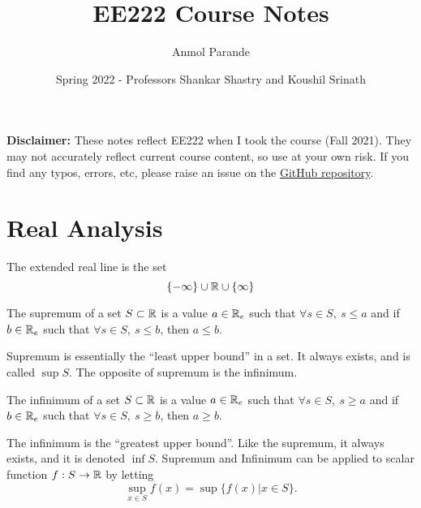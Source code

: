 

\title{EE222 Course Notes}
\author{Anmol Parande}
\date{Spring 2022 - Professors Shankar Shastry and Koushil Srinath}
\maketitle
\textbf{Disclaimer: }These notes reflect EE222 when I took the course (Fall 2021). They may not accurately reflect current course content, so use at your own risk.
If you find any typos, errors, etc, please raise an issue on the \href{https://github.com/parandea17/BerkeleyNotes}{GitHub repository}.
\tableofcontents
\newpage
\section{Real Analysis}
\begin{definition}
	The extended real line is the set \[
		\{-\infty\} \cup \mathbb{R} \cup \{\infty\}
	\]
	\label{defn:extended-real-line}
\end{definition}
\begin{definition}
	The supremum of a set $S \subset \mathbb{R}$ is a value $a \in \mathbb{R}_e$
	such that $\forall s\in S,\ s \leq a$ and if $b \in \mathbb{R}_e$ such that
	$\forall s\in S,\ s \leq b$, then $a \leq b$.
	\label{defn:supremum}
\end{definition}
Supremum is essentially the ``least upper bound'' in a set. It always exists,
and is called $\sup S$. The opposite of supremum is the infinimum.
\begin{definition}
	The infinimum of a set $S \subset \mathbb{R}$ is a value $a \in \mathbb{R}_e$
	such that $\forall s\in S,\ s \geq a$ and if $b \in \mathbb{R}_e$ such that
	$\forall s\in S,\ s \geq b$, then $a \geq b$.
	\label{defn:infinimum}
\end{definition}
The infinimum is the ``greatest upper bound''. Like the supremum, it always
exists, and it is denoted $\inf S$. Supremum and Infinimum can be applied to
scalar function $f: S\to \mathbb{R}$ by letting \[
	\sup_{x\in S} f(x) = \sup \{f(x) | x\in S \}.
\]
